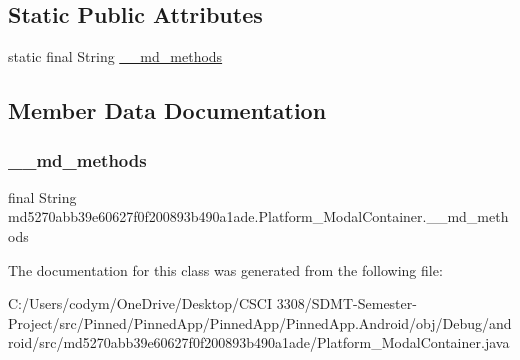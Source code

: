 \subsection*{Static Public Attributes}
\begin{DoxyCompactItemize}
\item 
static final String \hyperlink{classmd5270abb39e60627f0f200893b490a1ade_1_1_platform___modal_container_a43ca49e3a86d594a515e295f1356f624}{\+\_\+\+\_\+md\+\_\+methods}
\end{DoxyCompactItemize}


\subsection{Member Data Documentation}
\mbox{\label{classmd5270abb39e60627f0f200893b490a1ade_1_1_platform___modal_container_a43ca49e3a86d594a515e295f1356f624}} 
\subsubsection{\texorpdfstring{\+\_\+\+\_\+md\+\_\+methods}{\_\_md\_methods}}
{\footnotesize\ttfamily final String md5270abb39e60627f0f200893b490a1ade.\+Platform\+\_\+\+Modal\+Container.\+\_\+\+\_\+md\+\_\+methods\hspace{0.3cm}{\ttfamily [static]}}



The documentation for this class was generated from the following file\+:\begin{DoxyCompactItemize}
\item 
C\+:/\+Users/codym/\+One\+Drive/\+Desktop/\+C\+S\+C\+I 3308/\+S\+D\+M\+T-\/\+Semester-\/\+Project/src/\+Pinned/\+Pinned\+App/\+Pinned\+App/\+Pinned\+App.\+Android/obj/\+Debug/android/src/md5270abb39e60627f0f200893b490a1ade/Platform\+\_\+\+Modal\+Container.\+java\end{DoxyCompactItemize}
